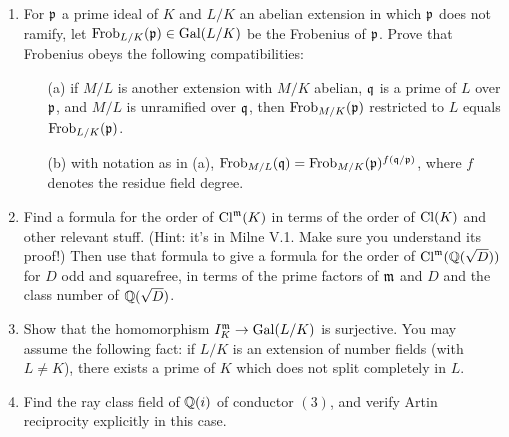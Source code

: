 \begin{enumerate}
\item
For $\mathfrak{p}$ a prime ideal
of $K$ and $L/K$ an abelian extension in which $\mathfrak{p}$ does not
ramify, let $\operatorname{Frob}_{L/K}(\mathfrak{p}) \in \operatorname{Gal}(L/K)$ be the Frobenius of $\mathfrak{p}$.
Prove that Frobenius obeys the following compatibilities:
\begin{enumerate}
\item[(a)] if $M/L$ is another extension with $M/K$ abelian,
$\mathfrak{q}$ is a prime
of $L$ over $\mathfrak{p}$, and $M/L$ is unramified over $\mathfrak{q}$,
then $\operatorname{Frob}_{M/K}(\mathfrak{p})$ restricted to $L$ equals $\operatorname{Frob}_{L/K}(\mathfrak{p})$.
\item[(b)] with notation as in (a), $\operatorname{Frob}_{M/L}(\mathfrak{q})
= \operatorname{Frob}_{M/K}(\mathfrak{p})^{f(\mathfrak{q}/\mathfrak{p})}$, where $f$ denotes the residue
field degree.
\end{enumerate}
\item
Find a formula for the order of $\operatorname{Cl}^{\mathfrak{m}}(K)$ in terms of the order
of $\operatorname{Cl}(K)$ and other relevant stuff. (Hint: it's in Milne V.1. Make sure
you understand its proof!) Then use that formula to give a formula for the
order of $\operatorname{Cl}^{\mathfrak{m}}(\mathbb{Q}(\sqrt{D}))$ for $D$ odd and squarefree, in terms
of the prime factors of $\mathfrak{m}$ and $D$ and the class number of
$\mathbb{Q}(\sqrt{D})$.
\item
Show that the homomorphism $I_K^{\mathfrak{m}} \to \operatorname{Gal}(L/K)$ is surjective. You 
may assume the following fact: if $L/K$ is an extension of number fields
(with $L \neq K$), there exists a prime of $K$ which does not split
completely in $L$.
\item
Find the ray class field of $\mathbb{Q}(i)$ of conductor $(3)$, and verify
Artin reciprocity explicitly in this case.
\end{enumerate}

%


